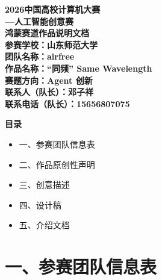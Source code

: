 \documentclass[fontset=windows,a4paper,UTF8]{ctexart}
\begin{document}
\begin{center}
  \vspace*{1.2cm}
  {\bfseries 2026中国高校计算机大赛}\\[8pt]
  {\bfseries —人工智能创意赛}\\[10pt]
  {\bfseries 鸿蒙赛道作品说明文档}\\[2.2cm]

  {\bfseries 参赛学校：山东师范大学}\\[10pt]
  {\bfseries 团队名称：airfree}\\[10pt]
  {\bfseries 作品名称：“同频” Same Wavelength}\\[10pt]
  {\bfseries 赛题方向：Agent 创新}\\[10pt]
  {\bfseries 联系人（队长）：邓子祥}\\[10pt]
  {\bfseries 联系电话（队长）：15656807075}
\end{center}
\clearpage

\begin{center}{\bfseries 目\quad 录}\end{center}
\vspace{0.6cm}
\begin{itemize}[leftmargin=2em,itemsep=8pt]
  \item 一、参赛团队信息表
  \item 二、作品原创性声明
  \item 三、创意描述
  \item 四、设计稿
  \item 五、介绍文档
\end{itemize}
\clearpage

\section*{一、参赛团队信息表}

\renewcommand{\arraystretch}{1.35}
\noindent{}
\end{document}
